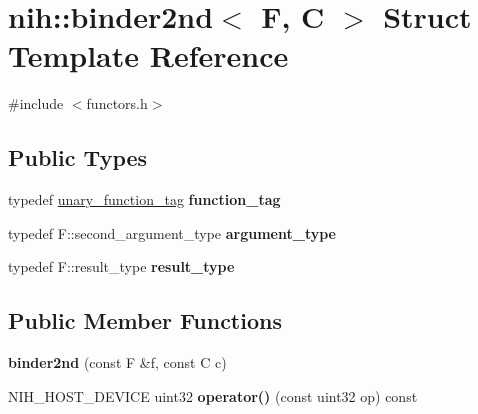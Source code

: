 \hypertarget{structnih_1_1binder2nd}{
\section{nih\-:\-:binder2nd$<$ \-F, \-C $>$ \-Struct \-Template \-Reference}
\label{structnih_1_1binder2nd}
}


{\ttfamily \#include $<$functors.\-h$>$}

\subsection*{\-Public \-Types}
\begin{DoxyCompactItemize}
\item 
\hypertarget{structnih_1_1binder2nd_a65b0e110113c7f09d3329524cfd503c3}{
typedef \hyperlink{structnih_1_1unary__function__tag}{unary\-\_\-function\-\_\-tag} {\bfseries function\-\_\-tag}}
\label{structnih_1_1binder2nd_a65b0e110113c7f09d3329524cfd503c3}

\item 
\hypertarget{structnih_1_1binder2nd_a98efc110702210069dcf12e06242e6a0}{
typedef \-F\-::second\-\_\-argument\-\_\-type {\bfseries argument\-\_\-type}}
\label{structnih_1_1binder2nd_a98efc110702210069dcf12e06242e6a0}

\item 
\hypertarget{structnih_1_1binder2nd_a209fd1a3d56e6ddc6d6337b1ca96bdfd}{
typedef \-F\-::result\-\_\-type {\bfseries result\-\_\-type}}
\label{structnih_1_1binder2nd_a209fd1a3d56e6ddc6d6337b1ca96bdfd}

\end{DoxyCompactItemize}
\subsection*{\-Public \-Member \-Functions}
\begin{DoxyCompactItemize}
\item 
\hypertarget{structnih_1_1binder2nd_a2910548c5492759c241ed5934087d5d5}{
{\bfseries binder2nd} (const \-F \&f, const \-C c)}
\label{structnih_1_1binder2nd_a2910548c5492759c241ed5934087d5d5}

\item 
\hypertarget{structnih_1_1binder2nd_a653da027b2cfe1fd0ba0214550f1fd73}{
\-N\-I\-H\-\_\-\-H\-O\-S\-T\-\_\-\-D\-E\-V\-I\-C\-E uint32 {\bfseries operator()} (const uint32 op) const }
\label{structnih_1_1binder2nd_a653da027b2cfe1fd0ba0214550f1fd73}

\end{DoxyCompactItemize}
